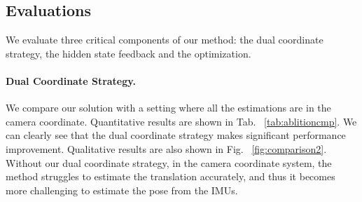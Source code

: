 \subsection{Evaluations}\label{sec:evaluations}
We evaluate three critical components of our method: the dual coordinate strategy, the hidden state feedback and the optimization.
\paragraph{Dual Coordinate Strategy.}
%
We compare our solution with a setting where all the estimations are in the camera coordinate.
%
Quantitative results are shown in Tab. ~\ref{tab:ablitioncmp}.
%
We can clearly see that the dual coordinate strategy makes significant performance improvement.
%
Qualitative results are also shown in Fig. ~\ref{fig:comparison2}.
%
Without our dual coordinate strategy, in the camera coordinate system, the method struggles to estimate the translation accurately, and thus it becomes more challenging to estimate the pose from the IMUs.  
%
